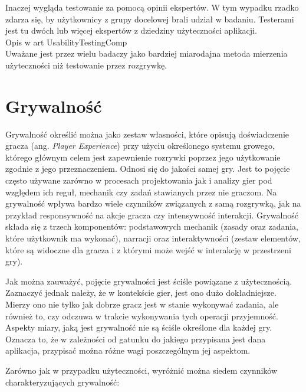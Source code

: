 \documentclass[a4paper,12pt,numbers=noenddot]{report}
\begin{document}
Inaczej wygląda testowanie za pomocą opinii ekspertów. W tym wypadku rzadko zdarza się, by użytkownicy z grupy docelowej brali udział w badaniu. Testerami jest tu dwóch lub więcej ekspertów z dziedziny użyteczności aplikacji.
\\
Opis w art UsabilityTestingComp
\\
Uważane jest przez wielu badaczy jako bardziej miarodajna metoda mierzenia użyteczności niż testowanie przez rozgrywkę. \cite{art_UsabilityTestingComp}


\section{Grywalność}
Grywalność określić można jako zestaw własności, które opisują doświadczenie gracza (ang. \textit{Player Experience}) przy użyciu określonego systemu growego, którego głównym celem jest zapewnienie rozrywki poprzez jego użytkowanie zgodnie z jego przeznaczeniem. \cite{art_Playability} Odnosi się do jakości samej gry. Jest to pojęcie często używane zarówno w procesach projektowania jak i analizy gier pod względem ich reguł, mechanik czy zadań stawianych przez nie graczom. Na grywalność wpływa bardzo wiele czynników związanych z samą rozgrywką, jak na przykład responsywność na akcje gracza czy intensywność interakcji.
Grywalność składa się z trzech komponentów: podstawowych mechanik (zasady oraz zadania, które użytkownik ma wykonać), narracji oraz interaktywności (zestaw elementów, które są widoczne dla gracza i z którymi może wejść w interakcję w przestrzeni gry). \cite{art_UserExperience}

Jak można zauważyć, pojęcie grywalności jest ściśle powiązane z użytecznością. Zaznaczyć jednak należy, że w kontekście gier, jest ono dużo dokładniejsze. Mierzy ono nie tylko jak dobrze gracz jest w stanie wykonywać zadania, ale również to, czy odczuwa w trakcie wykonywania tych operacji przyjemność. Aspekty miary, jaką jest grywalność nie są ściśle określone dla każdej gry. Oznacza to, że w zależności od gatunku do jakiego przypisana jest dana aplikacja, przypisać można różne wagi poszczególnym jej aspektom.

Zarówno jak w przypadku użyteczności, wyróżnić można siedem czynników charakteryzujących grywalność:
\end{document}
